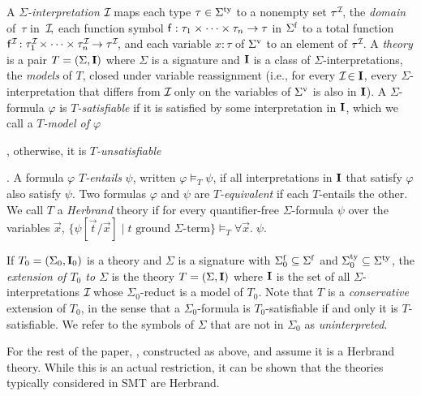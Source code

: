 A \emph{$\Sigma$-interpretation $\mathcal{I\!}$} %
maps each type $\tau \in \stypes{\Sigma}$ to a nonempty set $\tau^{\mathcal{I\!}}$,
the \emph{domain} of~$\tau$ in~$\mathcal{I\!},$
each function symbol $\mathsf{f} : \tau_1 \times \cdots \times \tau_n \rightarrow \tau$ in $\sfuns{\Sigma}$
to a total function $\mathsf{f}^{\mathcal{I\!}} : \tau_{\smash{1}}^{\mathcal{I\!}} \times \cdots \times\allowbreak \tau_n^{\mathcal{I\!}} \rightarrow\allowbreak \tau^{\mathcal{I\!}}$,
and each variable $x:\tau$ of $\svars{\Sigma}$ to an element of $\tau^{\mathcal{I\!}}$.
A \emph{theory} is a pair $T = (\Sigma, \Mo)$ where
$\Sigma$ is a signature and ${\mathbf{I}}$ is a class of $\Sigma$-interpretations,
the \emph{models} of $T$, closed under variable reassignment
(i.e., for every $\mathcal{I\!} \in {\mathbf{I}}$, every $\Sigma$-interpretation that differs
from $\mathcal{I\!}$ only on the variables of $\svars \Sigma$ is also in ${\mathbf{I}}$).
A $\Sigma$-formula $\varphi$ is \emph{$T$-satisfiable}
if it is satisfied by some interpretation in ${\mathbf{I}}$,
which we call a \emph{$T$-model of $\varphi$}\begin{rep},
otherwise, it is \emph{$T$-unsatisfiable}\end{rep}.
A formula $\varphi$ \emph{$T$-entails} $\psi$, written $\varphi \models_T \psi$,
if all interpretations in ${\mathbf{I}}$ that satisfy $\varphi$ also satisfy $\psi$.
Two formulas $\varphi$ and $\psi$ are \emph{$T$-equivalent}
if each $T$-entails the other.
We call $T$ a \emph{Herbrand} theory if 
for every quantifier-free $\Sigma$-formula $\psi$ over the variables $\vec x$,
$\{\psi[\vec t/\vec x] \mid t \text{ ground $\Sigma$-term}\} \models_T \forall \vec x.\; \psi$.

If $T_0 = (\Sigma_0, \Mo_0)$ is a theory and $\Sigma$ is a signature
with $\sfuns{\Sigma_0} \subseteq \sfuns{\Sigma}$ 
and $\stypes{\Sigma_0} \subseteq \stypes{\Sigma}$,
the \emph{extension of $T_0$ to $\Sigma$} is the theory $T = (\Sigma, \Mo)$ 
where ${\mathbf{I}}$ is the set of all $\Sigma$-interpretations $\mathcal{I\!}$
whose $\Sigma_0$-reduct is a model of $T_0$.
Note that $T$ is a \emph{conservative} extension of $T_0$, in the sense that
a $\Sigma_0$-formula is $T_0$-satisfiable if and only it is $T$-satisfiable.
We refer to the symbols of $\Sigma$ that are not in $\Sigma_0$ as \emph{uninterpreted}.

For the rest of the paper, , constructed as above, and assume it is a Herbrand theory.
While this is an actual restriction, it can be shown that the theories typically considered 
in SMT are Herbrand. 

